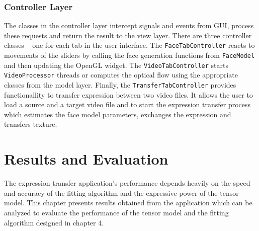 \documentclass[11pt,a4paper]{report}
\begin{document}
\subsection{Controller Layer}
The classes in the controller layer intercept signals and events from GUI,
process these requests and return the result to the view layer. There are three
controller classes -- one for each tab in the user interface. The
\texttt{FaceTabController} reacts to movements of the sliders by calling the
face generation functions from \texttt{FaceModel} and then updating the OpenGL
widget. The \texttt{VideoTabController} starts \texttt{VideoProcessor} threads
or computes the optical flow using the appropriate classes from the model
layer. Finally, the \texttt{TransferTabController} provides functionallity to
transfer expression between two video files. It allows the user to load a source
and a target video file and to start the expression transfer process which
estimates the face model parameters, exchanges the expression and transfers
texture.


\chapter{Results and Evaluation}
The expression transfer application's performance depends heavily on the speed
and accuracy of the fitting algorithm and the expressive power of the tensor
model. This chapter presents results obtained from the application which can be
analyzed to evaluate the performance of the tensor model and the fitting
algorithm designed in chapter 4.
\end{document}
